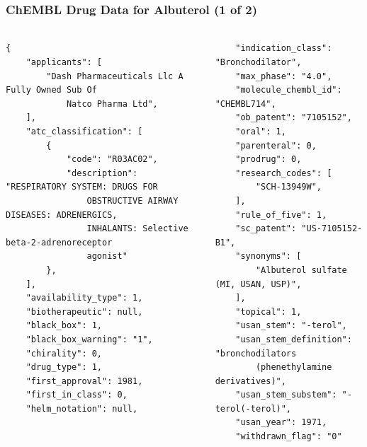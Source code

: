 \documentclass[aspectratio=169,xcolor=dvipsnames]{beamer}
\begin{document}
\begin{frame}[fragile,t]
  \frametitle{ChEMBL Drug Data for Albuterol (1 of 2)}
  \framesubtitle{}
  \tiny
  \begin{columns}[t]
    \begin{column}{0.5\textwidth}
\begin{verbatim}
{
    "applicants": [
        "Dash Pharmaceuticals Llc A Fully Owned Sub Of
            Natco Pharma Ltd",
    ],
    "atc_classification": [
        {
            "code": "R03AC02",
            "description": "RESPIRATORY SYSTEM: DRUGS FOR
                OBSTRUCTIVE AIRWAY DISEASES: ADRENERGICS,
                INHALANTS: Selective beta-2-adrenoreceptor
                agonist"
        },
    ],
    "availability_type": 1,
    "biotherapeutic": null,
    "black_box": 1,
    "black_box_warning": "1",
    "chirality": 0,
    "drug_type": 1,
    "first_approval": 1981,
    "first_in_class": 0,
    "helm_notation": null,
\end{verbatim}
    \end{column}
    \begin{column}{0.5\textwidth}
\begin{verbatim}
    "indication_class": "Bronchodilator",
    "max_phase": "4.0",
    "molecule_chembl_id": "CHEMBL714",
    "ob_patent": "7105152",
    "oral": 1,
    "parenteral": 0,
    "prodrug": 0,
    "research_codes": [
        "SCH-13949W",
    ],
    "rule_of_five": 1,
    "sc_patent": "US-7105152-B1",
    "synonyms": [
        "Albuterol sulfate (MI, USAN, USP)",
    ],
    "topical": 1,
    "usan_stem": "-terol",
    "usan_stem_definition": "bronchodilators
        (phenethylamine derivatives)",
    "usan_stem_substem": "-terol(-terol)",
    "usan_year": 1971,
    "withdrawn_flag": "0"
\end{verbatim}
    \end{column}
  \end{columns}
\end{frame}
\end{document}
